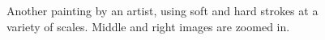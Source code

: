 \documentclass[review,draft]{acmsiggraph}
\begin{document}
\begin{figure}
    \centering
    \caption{Another painting by an artist, using soft and hard strokes at a variety of scales.  Middle and right images are zoomed in.}
    \label{fig:stop}
\end{figure}
\end{document}
